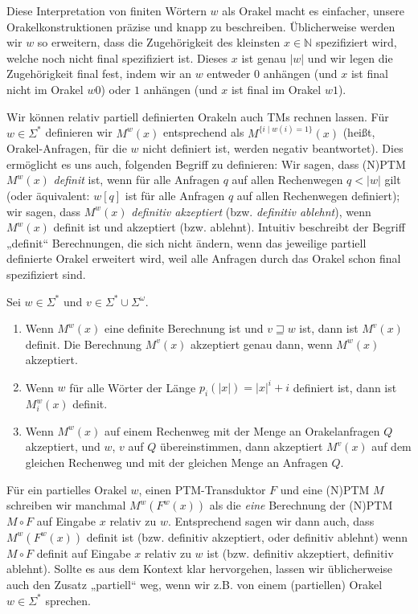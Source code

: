 Diese Interpretation von finiten Wörtern $w$ als Orakel macht es einfacher, unsere Orakelkonstruktionen präzise und knapp zu beschreiben. Üblicherweise werden wir $w$ so erweitern, dass die Zugehörigkeit des kleinsten $x\in\mathbb N$ spezifiziert wird, welche noch nicht final spezifiziert ist. Dieses $x$ ist genau $|w|$ und wir legen die Zugehörigkeit final fest, indem wir an $w$ entweder $0$ anhängen (und $x$ ist final nicht im Orakel $w0$) oder $1$ anhängen (und $x$ ist final im Orakel $w1$).


Wir können relativ partiell definierten Orakeln auch TMs rechnen lassen. Für $w\in\Sigma^*$ definieren wir $M^w(x)$ entsprechend als $M^{\{i\mid w(i)=1\}}(x)$ (heißt, Orakel-Anfragen, für die $w$ nicht definiert ist, werden negativ beantwortet).
Dies ermöglicht es uns auch, folgenden Begriff zu definieren: Wir sagen, dass (N)PTM $M^w(x)$ \emph{definit} ist, wenn für alle Anfragen $q$ auf allen Rechenwegen $q<|w|$ gilt (oder äquivalent: $w[q]$ ist für alle Anfragen $q$ auf allen Rechenwegen definiert); wir sagen, dass $M^w(x)$ \emph{definitiv akzeptiert} (bzw. \emph{definitiv ablehnt}), wenn $M^w(x)$ definit ist und akzeptiert (bzw. ablehnt). Intuitiv beschreibt der Begriff „definit“ Berechnungen, die sich nicht ändern, wenn das jeweilige partiell definierte Orakel erweitert wird, weil alle Anfragen durch das Orakel schon final spezifiziert sind.
\begin{observation}\label{obs:partialoracles}
    Sei $w\in\Sigma^*$ und $v\in\Sigma^*\cup\Sigma^\omega$.
    \begin{enumerate}
        \item Wenn $M^w(x)$ eine definite Berechnung ist und $v\sqsupseteq w$ ist, dann ist $M^v(x)$ definit. Die Berechnung $M^v(x)$ akzeptiert genau dann, wenn $M^w(x)$ akzeptiert.
        \item Wenn $w$ für alle Wörter der Länge $p_i(|x|)=|x|^i+i$ definiert ist, dann ist $M_i^w(x)$ definit.
        \item Wenn $M^w(x)$ auf einem Rechenweg mit der Menge an Orakelanfragen $Q$ akzeptiert, und $w$, $v$ auf $Q$ übereinstimmen, dann akzeptiert $M^v(x)$ auf dem gleichen Rechenweg und mit der gleichen Menge an Anfragen $Q$.
    \end{enumerate}
\end{observation}

Für ein partielles Orakel $w$, einen PTM-Transduktor $F$ und eine (N)PTM $M$ schreiben wir manchmal $M^w(F^w(x))$ als die \emph{eine} Berechnung der (N)PTM $M\circ F$ auf Eingabe $x$ relativ zu $w$.
Entsprechend sagen wir dann auch, dass $M^w(F^w(x))$ definit ist (bzw. definitiv akzeptiert, oder definitiv ablehnt) wenn $M\circ F$ definit auf Eingabe $x$ relativ zu $w$ ist (bzw. definitiv akzeptiert, definitiv ablehnt).
Sollte es aus dem Kontext klar hervorgehen, lassen wir üblicherweise auch den Zusatz „partiell“ weg, wenn wir z.B. von einem (partiellen) Orakel $w\in\Sigma^*$ sprechen.

